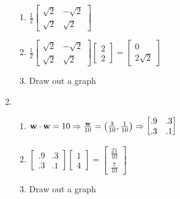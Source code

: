 \documentclass[12pt]{article}
\begin{document}
\begin{enumerate}
\begin{enumerate}
      \item  $\frac{1}{2}\begin{bmatrix} \sqrt{2} & -\sqrt{2}\\ \sqrt{2} & \sqrt{2} \end{bmatrix}$

      \item $\frac{1}{2}\begin{bmatrix} \sqrt{2} & -\sqrt{2}\\ \sqrt{2} & \sqrt{2} \end{bmatrix}\begin{bmatrix} 2\\2\end{bmatrix}=\begin{bmatrix} 0\\ 2\sqrt{2}\end{bmatrix}$

      \item Draw out a graph

    \end{enumerate}

    \setcounter{enumi}{20}

  \item

    \begin{enumerate}

      \item $\bold{w}\cdot\bold{w}=10\Rightarrow\frac{\bold{w}}{10}=\left( \frac{3}{10},\frac{1}{10} \right)\Rightarrow\begin{bmatrix} .9 & .3\\ .3 & .1\end{bmatrix}$

      \item $\begin{bmatrix} .9 & .3\\ .3 & .1\end{bmatrix}\begin{bmatrix} 1\\4\end{bmatrix}=\begin{bmatrix} \frac{21}{10}\\ \frac{7}{10} \end{bmatrix}$

      \item Draw out a graph

    \end{enumerate}

    \setcounter{enumi}{36}


\end{enumerate}
\end{document}
